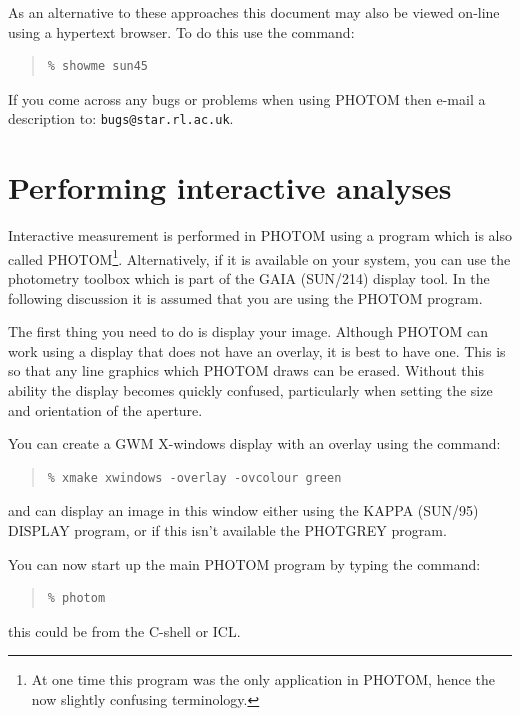 \documentclass[twoside,11pt]{article}
\newcommand{\htmlref}[2]{#1}
\newcommand{\xref}[3]{#1}
\newcommand{\xlabel}[1]{}
\renewcommand{\_}{\texttt{\symbol{95}}}
\begin{document}
As an alternative to these approaches this document may also be viewed
on-line using a hypertext browser. To do this use the command:
\begin{quote}
\begin{verbatim}
% showme sun45
\end{verbatim}
\end{quote}

If you come across any bugs or problems when using PHOTOM then e-mail
a description to: \texttt{bugs@star.rl.ac.uk}.

\section{\xlabel{performing_interactive_analyses}Performing interactive analyses}

Interactive measurement is performed in
PHOTOM using a program which is also called PHOTOM\footnote{At one
time this program was the only application in PHOTOM, hence the
now slightly confusing terminology.}. Alternatively, if
it is available on your system, you can use the photometry
toolbox which is part of the \xref{GAIA}{sun214}{} (SUN/214) display
tool. In the following discussion it is assumed that you are using
the PHOTOM program.

The first thing you need to do is display your image. Although PHOTOM
can work using a display that does not have an overlay, it is best
to have one. This is so that any line graphics which PHOTOM draws can
be erased. Without this ability the display becomes quickly confused,
particularly when setting the size and orientation of the aperture.

You can create a \xref{GWM X-windows}{sun130}{} display with an overlay
using the command:
\begin{quote}
\begin{verbatim}
% xmake xwindows -overlay -ovcolour green
\end{verbatim}
\end{quote}
and can display an image in this window either using the
\xref{KAPPA (SUN/95)}{sun95}{}
\xref{DISPLAY}{sun95}{DISPLAY} program, or if this isn't available
the \htmlref{PHOTGREY}{PHOTGREY} program.

You can now start up the main PHOTOM program by typing the command:
\begin{quote}
\begin{verbatim}
% photom
\end{verbatim}
\end{quote}
this could be from the C-shell or ICL.
\end{document}
